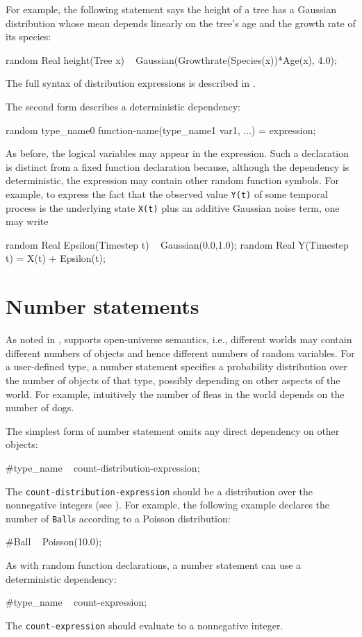 \documentclass[12pt]{article}
\begin{document}
For example, the following statement says the height of a tree has a Gaussian distribution
whose mean depends linearly on the tree's age and the growth rate of its species:
\begin{blogcode}
random Real height(Tree x) ~ Gaussian(Growthrate(Species(x))*Age(x), 4.0);
\end{blogcode}
The full syntax of distribution expressions is described in .

The second form describes a deterministic dependency:
\begin{blogcode}
random type_name0 function-name(type_name1 var1, ...) = expression;
\end{blogcode}
As before, the logical variables may appear in the expression.
Such a declaration is distinct from a fixed function declaration because, although the dependency is deterministic,
the expression may contain other random function symbols. For example, 
to express the fact that the observed value {\tt Y(t)} of some temporal process 
is the underlying state {\tt X(t)} plus an additive Gaussian noise term, one may write
\begin{blogcode}
random Real Epsilon(Timestep t) ~ Gaussian(0.0,1.0);
random Real Y(Timestep t) = X(t) + Epsilon(t);
\end{blogcode}




\section{Number statements}\label{number-section}
As noted in , \bl supports open-universe semantics, i.e., different worlds may contain different numbers of objects and hence different numbers of random variables.
For a user-defined type, a number statement specifies a probability distribution over the number of objects of that type, possibly depending
on other aspects of the world. For example, intuitively the number of fleas in the world depends on the number of dogs.

The simplest form of number statement omits any direct dependency on other objects:
\begin{blogcode}
#type_name ~ count-distribution-expression;
\end{blogcode}
The {\tt count-distribution-expression} should be a distribution over
the nonnegative integers (see ).
For example, the following example declares the number of \texttt{Ball}s according to a Poisson distribution:
\begin{blogcode}
#Ball ~ Poisson(10.0);
\end{blogcode}
As with random function declarations, a number statement can use a deterministic dependency:
\begin{blogcode}
#type_name ~ count-expression;
\end{blogcode}
The {\tt count-expression} should evaluate to a nonnegative integer.
\end{document}
